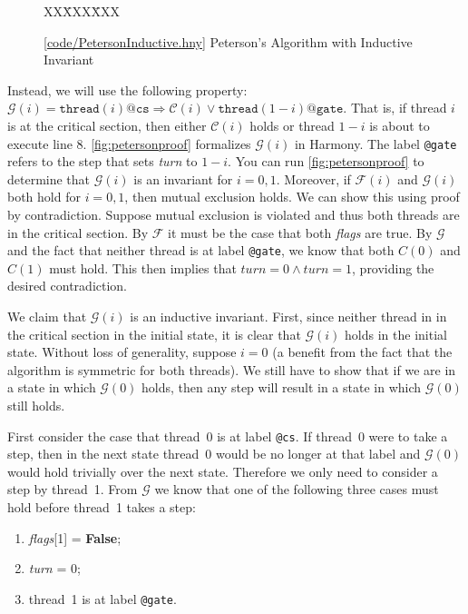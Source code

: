 \documentclass{report}
\newcommand{\harmonysource}[1]{
\begin{tabbing}
XX\=XXX\=XXX\kill
    
\end{tabbing}
}
\newcommand{\harmonylink}[1]{%
[\href{https://harmony.cs.cornell.edu/#1}{\underline{#1}}]%
}
\newenvironment{code}{
\tcolorbox
}{
\endtcolorbox
}
\begin{document}
\begin{figure}
\begin{code}
\harmonysource{PetersonInductive}
\end{code}
\caption{\harmonylink{code/PetersonInductive.hny} Peterson's Algorithm with Inductive Invariant}
\label{fig:petersonproof}
\end{figure}

Instead, we will use the following property: $\mathcal{G}(i) =
\mathtt{thread}(i)@\mathtt{cs} \Rightarrow \mathcal{C}(i) \lor \mathtt{thread}(1-i)@\mathtt{gate}$.
That is, if thread $i$ is at the critical section, then
either $\mathcal{C}(i)$ holds or thread $1-i$ is about to execute line 8.
\autoref{fig:petersonproof} formalizes $\mathcal{G}(i)$ in Harmony.
The label \texttt{@gate} refers to the step that sets \textit{turn} to $1-i$.
You can run \autoref{fig:petersonproof} to determine
that $\mathcal{G}(i)$ is an invariant for $i = 0, 1$.
Moreover, if $\mathcal{F}(i)$ and $\mathcal{G}(i)$ both hold for $i = 0, 1$,
then mutual exclusion holds.  We can show this using proof by
contradiction.  Suppose mutual exclusion is violated and thus both threads are in
the critical section.  By $\mathcal{F}$ it must be the case that both
\textit{flags} are true.  By $\mathcal{G}$ and the fact that neither thread
is at label \texttt{@gate}, we know that both $C(0)$ and $C(1)$ must hold.
This then implies that $\mathit{turn} = 0 \land \mathit{turn} = 1$, providing
the desired contradiction.

We claim that $\mathcal{G}(i)$ is an inductive invariant.
First, since neither thread in in the critical section in the initial state,
it is clear that $\mathcal{G}(i)$ holds in the initial state.
Without loss of generality, suppose $i=0$ (a benefit from the fact that the algorithm is
symmetric for both threads).  We still have to show that if we are in a state
in which $\mathcal{G}(0)$ holds, then any step will result in a
state in which $\mathcal{G}(0)$ still holds.

First consider the case that thread~0 is at label \texttt{@cs}.  If thread~0
were to take a step, then in the next state thread~0 would be no longer
at that label and $\mathcal{G}(0)$ would hold trivially over the next state.
Therefore we only need to consider a step by thread~1.
%
From $\mathcal{G}$ we know that one of the following three cases must hold before
thread~1 takes a step:
\begin{enumerate}
\item \textit{flags}[1] = \textbf{False};
\item \textit{turn} = 0;
\item thread~1 is at label \texttt{@gate}.
\end{enumerate}
\end{document}
